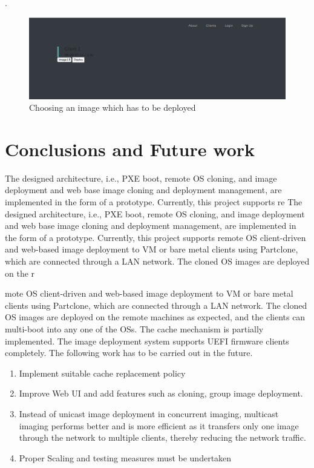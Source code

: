 \documentclass[a4paper,12pt]{article}
\begin{document}
.
\newpage
\begin{figure}[h!]
    \centering
    \includegraphics[width=\linewidth]{webapp3.png}
    \caption{Choosing an image which has to be deployed}
    \label{task_image_deploy}
\end{figure}

\newpage
\section{\fontsize{16pt}{1em} Conclusions and Future work}
 The designed architecture, i.e., PXE boot, remote OS cloning, and image deployment and web base image cloning and deployment management, are implemented in the form of a prototype. Currently, this project supports re The designed architecture, i.e., PXE boot, remote OS cloning, and image deployment and web base image cloning and deployment management, are implemented in the form of a prototype. Currently, this project supports remote OS client-driven and web-based image deployment to VM or bare metal clients using Partclone, which are connected through a LAN network. The cloned OS images are deployed on the r

mote OS client-driven and web-based image deployment to VM or bare metal clients using Partclone, which are connected through a LAN network. The cloned OS images are deployed on the remote machines as expected, and the clients can multi-boot into any one of the OSs. The cache mechanism is partially implemented. The image deployment system supports UEFI firmware clients completely. The following work has to be carried out in the future.
\begin{enumerate}
    \item Implement suitable cache replacement policy  
    \item Improve Web UI and add features such as cloning, group image deployment.
    \item Instead of unicast image deployment in concurrent imaging, multicast imaging performs better and is more efficient as it transfers only one image through the network to multiple clients, thereby reducing the network traffic.
    \item Proper Scaling and testing measures must be undertaken
\end{enumerate}
\end{document}
